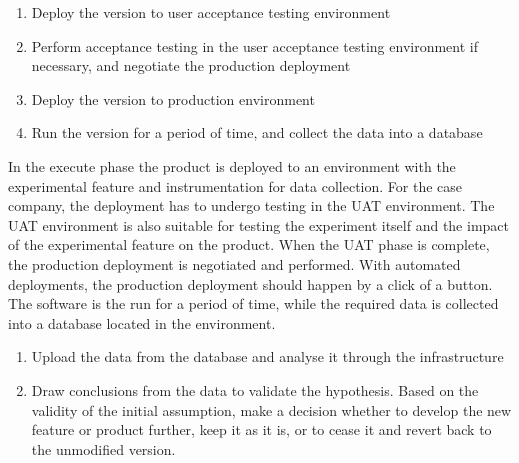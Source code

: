 \documentclass[english]{tktltiki2}
\theoremstyle{definition}
\theoremstyle{remark}
\begin{document}


\begin{enumerate}
  \item Deploy the version to user acceptance testing environment %
  \item Perform acceptance testing in the user acceptance testing environment if necessary, and negotiate the production deployment
  \item Deploy the version to production environment
  \item Run the version for a period of time, and collect the data into a database
  
\end{enumerate}

In the execute phase the product is deployed to an environment with the experimental feature and instrumentation for data collection. For the case company, the deployment has to undergo testing in the UAT environment. The UAT environment is also suitable for testing the experiment itself and the impact of the experimental feature on the product. When the UAT phase is complete, the production deployment is negotiated and performed. With automated deployments, the production deployment should happen by a click of a button. The software is the run for a period of time, while the required data is collected into a database located in the environment. 

\begin{enumerate}
  \item Upload the data from the database and analyse it through the infrastructure
  \item Draw conclusions from the data to validate the hypothesis. Based on the validity of the initial assumption, make a decision whether to develop the new feature or product further, keep it as it is, or to cease it and revert back to the unmodified version. 
\end{enumerate}
\end{document}
